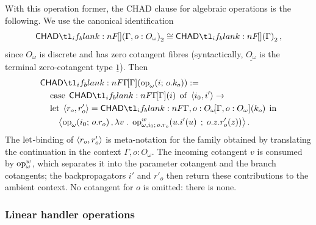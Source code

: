 \documentclass[11pt,a4paper]{article}
\theoremstyle{definition}
\theoremstyle{remark}
\providecommand{\lintype}[1]{\underline{#1}}
\begin{document}
With this operation former, the CHAD clause for algebraic operations is the
following.  We use the canonical identification
\[
  \Fun[np]{\chad}{\Gamma,o:O_{\omega}}_{2}
  \cong
  \Fun[np]{\chad}{\Gamma}_{2},
\]
since \(O_{\omega}\) is discrete and has zero cotangent fibres (syntactically, \(\lintype{O_{\omega}}\) is the terminal zero-cotangent type \(\underline{1}\)).  Then
\begin{equation}
  \label{eq:appendix-generic-operation-chad}
  \begin{aligned}
    &\Fun[np]{\chad[\Gamma]}{
      \fn[n]{\opn[b]{op}_{\omega}}{i;\,o.k_o}
    }
    :=
    \\
    &\quad
    \opn[b]{case}\;\Fun[np]{\chad[\Gamma]}{i}\;\opn[b]{of}\;
    \tuple{i_0,i'}\to
    \\
    &\quad
    \opn[b]{let}\;\tuple{r_o,r'_o}
    =
    \Fun[np]{\chad[\Gamma,o:O_{\omega}]}{k_o}
    \;\opn[b]{in}
    \\
    &\quad\quad
    \tuple{
      \fn[n]{\opn[b]{op}_{\omega}}{i_0;\,o.r_o},
      \lambda v\; .\;
      \fn[n]{\opn[b]{op}^{w}_{\omega,i_0;\,o.r_o}}{
        u.\fn[n]{i'}{u}
        \; ; \;
        o.z.\fn[n]{r'_o}{z}
      }
    } .
  \end{aligned}
\end{equation}
The \(\opn[b]{let}\)-binding of \(\left\langle r_o,r'_o\right\rangle\) is meta-notation for the
family obtained by translating the continuation in the context
\(\Gamma,o:O_{\omega}\).  The incoming cotangent \(v\) is consumed by
\(\opn[b]{op}^{w}_{\omega}\), which separates it into the parameter cotangent
and the branch cotangents; the backpropagators \(i'\) and \(r'_o\) then return
these contributions to the ambient context.  No cotangent for \(o\) is omitted:
there is none.

\subsubsection{Linear handler operations}
\end{document}
